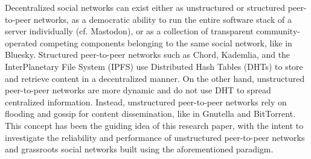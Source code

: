 Decentralized social networks can exist either as unstructured or structured peer-to-peer networks, as a democratic ability to run the entire software stack of a server individually (cf. Mastodon), or as a collection of transparent community-operated competing components belonging to the same social network, like in Bluesky.
Structured peer-to-peer networks such as Chord, Kademlia, and the InterPlanetary File System (IPFS) use Distributed Hash Tables (DHTs) to store and retrieve content in a decentralized manner. 
On the other hand, unstructured peer-to-peer networks are more dynamic and do not use DHT to spread centralized information. Instead, unstructured peer-to-peer networks rely on flooding and gossip for content dissemination, like in Gnutella and BitTorrent.
This concept has been the guiding idea of this research paper, with the intent to investigate the reliability and performance of unstructured peer-to-peer networks and grassroots social networks built using the aforementioned paradigm.